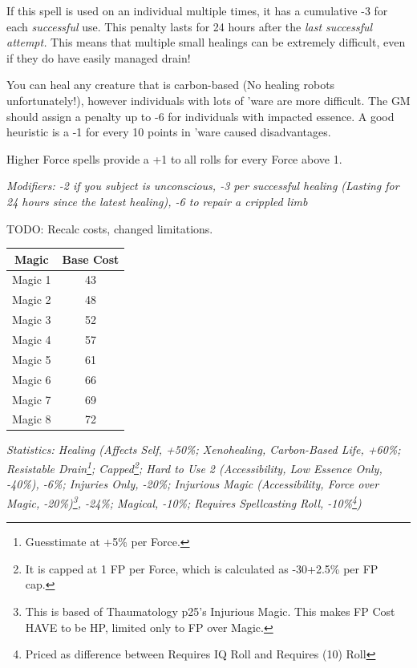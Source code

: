 \begin{multicols*}{3}
	If this spell is used on an individual multiple times, it has a cumulative -3 for each \textit{successful} use. This penalty lasts for 24 hours after the \textit{last successful attempt.} This means that multiple small healings can be extremely difficult, even if they do have easily managed drain!
	
	You can heal any creature that is carbon-based (No healing robots unfortunately!), however individuals with lots of 'ware are more difficult. The GM should assign a penalty up to -6 for individuals with impacted essence. A good heuristic is a -1 for every 10 points in 'ware caused disadvantages.
	
	Higher Force spells provide a +1 to all rolls for every Force above 1.
	
	\textcolor{NavyBlue}{\textit{Modifiers: -2 if you subject is unconscious, -3 per successful healing (Lasting for 24 hours since the latest healing), -6 to repair a crippled limb}}
	
	TODO: Recalc costs, changed limitations.
	 
	\begin{center}
		\begin{tabular}{|c|c|}
			\hline
			Magic & Base Cost \\
			\hline
			\hline
			Magic 1 & 43 \\
			Magic 2 & 48 \\
			Magic 3 & 52 \\
			Magic 4 & 57 \\
			Magic 5 & 61 \\
			Magic 6 & 66 \\
			Magic 7 & 69 \\
			Magic 8 & 72 \\
			\hline
		\end{tabular}
	\end{center}
	
	\textcolor{OliveGreen}{\textit{Statistics: Healing (Affects Self, +50\%; Xenohealing, Carbon-Based Life, +60\%; Resistable Drain\footnote{Guesstimate at +5\% per Force.}; Capped\footnote{It is capped at 1 FP per Force, which is calculated as -30+2.5\% per FP cap.}; Hard to Use 2 (Accessibility, Low Essence Only, -40\%), -6\%; Injuries Only, -20\%; Injurious Magic (Accessibility, Force over Magic, -20\%)\footnote{This is based of Thaumatology p25's Injurious Magic. This makes FP Cost HAVE to be HP, limited only to FP over Magic.}, -24\%; Magical, -10\%; Requires Spellcasting Roll, -10\%\footnote{Priced as difference between Requires IQ Roll and Requires (10) Roll})}}
	

\end{multicols*}
